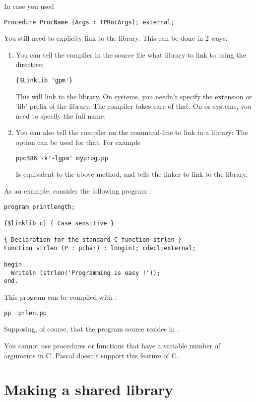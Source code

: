 \documentclass{report}
\begin{document}
In case you used
\begin{verbatim}
Procedure ProcName (Args : TPRocArgs); external;
\end{verbatim}
You still need to explicity link to the library. This can be done in 2 ways:
\begin{enumerate}
\item You can tell the compiler in the source file what library to link to
using the  directive:
\begin{verbatim}
{$LinkLib 'gpm'}
\end{verbatim}
This will link to the  library. On \linux systems, you needn't
specify the extension or 'lib' prefix of the library. The compiler takes
care of that. On \dos or \windows systems, you need to specify the full
name.
\item You can also tell the compiler on the command-line to link in a
library: The  option can be used for that. For example
\begin{verbatim}
ppc386 -k'-lgpm' myprog.pp
\end{verbatim}
Is equivalent to the above method, and tells the linker to link to the
 library.
\end{enumerate}

As an example; consider the following program :
\begin{verbatim}
program printlength;

{$linklib c} { Case sensitive }

{ Declaration for the standard C function strlen }
Function strlen (P : pchar) : longint; cdecl;external;

begin
  Writeln (strlen('Programming is easy !'));
end.
\end{verbatim}
This program can be compiled with :
\begin{verbatim}
pp  prlen.pp
\end{verbatim}
Supposing, of course, that the program source resides in .

You cannot use procedures or functions that have a variable number of
arguments in C. Pascal doesn't support this feature of C.

\section{Making a shared library}
\label{se:SharedLib}
\end{document}
